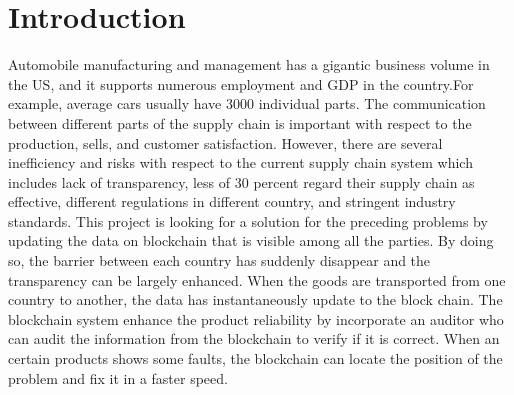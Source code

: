 \documentclass[12pt]{article}
\begin{document}
\section{Introduction}
Automobile manufacturing and management has a gigantic business volume in the US, and it supports numerous employment and GDP in the country.\newline For example, average cars usually have 3000 individual parts. The communication between different parts of the supply chain is important with respect to the production, sells, and customer satisfaction. However, there are several inefficiency and risks with respect to the current supply chain system which includes lack of transparency\cite{choudhurry_2020}, less of 30 percent regard their supply chain as effective, different regulations in different country, and stringent industry standards. This project is looking for a solution for the preceding problems by updating the data on blockchain that is visible among all the parties. By doing so, the barrier between each country has suddenly disappear and the transparency can be largely enhanced. When the goods are transported from one country to another, the data has instantaneously update to the block chain. The blockchain system enhance the product reliability by incorporate an auditor who can audit the information from the blockchain to verify if it is correct. When an certain products shows some faults, the blockchain can locate the position of the problem and fix it in a faster speed.

%
\end{document}
